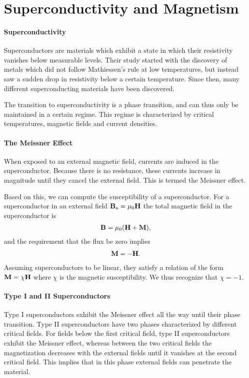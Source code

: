 \section{Superconductivity and Magnetism}

\paragraph{Superconductivity}
Superconductors are materials which exhibit a state in which their resistivity vanishes below measurable levels. Their study started with the discovery of metals which did not follow Mathiessen's rule at low temperatures, but instead saw a sudden drop in resistivity below a certain temperature. Since then, many different superconducting materials have been discovered.

The transition to superconductivity is a phase transition, and can thus only be maintained in a certain regime. This regime is characterized by critical temperatures, magnetic fields and current densities.

\paragraph{The Meissner Effect}
When exposed to an external magnetic field, currents are induced in the superconductor. Because there is no resistance, these currents increase in magnitude until they cancel the external field. This is termed the Meissner effect.

Based on this, we can compute the susceptibility of a superconductor. For a superconductor in an external field $\vb{B}_{\text{a}} = \mu_{0}\vb{H}$ the total magnetic field in the superconductor is
\begin{align*}
	\vb{B} = \mu_{0}(\vb{H} + \vb{M}),
\end{align*}
and the requirement that the flux be zero implies
\begin{align*}
	\vb{M} = -\vb{H}.
\end{align*}
Assuming superconductors to be linear, they satisfy a relation of the form $\vb{M} = \chi\vb{H}$ where $\chi$ is the magnetic susceptibility. We thus recognize that $\chi = -1$.

\paragraph{Type I and II Superconductors}
Type I superconductors exhibit the Meissner effect all the way until their phase transition. Type II superconductors have two phases characterized by different critical fields. For fields below the first critical field, type II superconductors exhibit the Meissner effect, whereas between the two critical fields the magnetization decreases with the external fields until it vanishes at the second critical field. This implies that in this phase external fields can penetrate the material.

